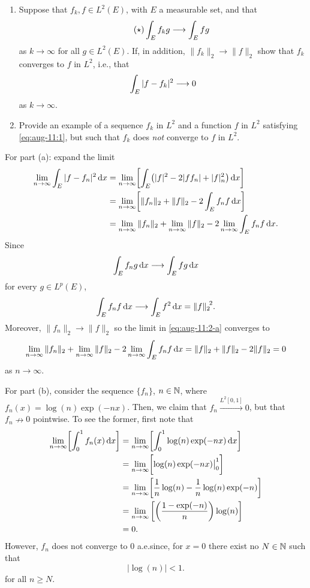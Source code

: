 \begin{problem}
  \hfill
  \begin{enumerate}[label=(\alph*),noitemsep]
  \item Suppose that \(f_k,f\in L^2(E)\), with \(E\) a measurable set, and
    that
    \[
      \label{eq:aug-11:1}
      \tag{\(\bigstar\)}
      \int_E f_kg\too\int_E fg
    \]
    as \(k\to\infty\) for all \(g\in L^2(E)\). If, in addition,
    \(\|f_k\|_2\to\|f\|_2\) show that \(f_k\) converges to \(f\) in
    \(L^2\), i.e., that
    \[
      \int_E|f-f_k|^2\longrightarrow 0
    \]
    as \(k\to\infty\).
  \item Provide an example of a sequence \(f_k\) in \(L^2\) and a function
    \(f\) in \(L^2\) satisfying \eqref{eq:aug-11:1}, but such that \(f_k\)
    does \emph{not} converge to \(f\) in \(L^2\).
  \end{enumerate}
\end{problem}
\begin{solution}
  For part (a): expand the limit
  \begin{gather}
    \label{eq:aug-11:2-a}
    \begin{aligned}
      \lim_{n\to\infty}\int_E|f-f_n|^2\mathop{}\!\mathrm{d} x
      &=\lim_{n\to\infty}\biggl[\int_E\bigl(|f|^2-2|ff_n|+|f|_n^2\bigr)\mathop{}\!\mathrm{d} x\biggr]\\
      &=\lim_{n\to\infty}\biggl[\|f_n\|_2+\|f\|_2-2\int_E f_nf\mathop{}\!\mathrm{d} x\biggr]\\
      &=\lim_{n\to\infty}\|f_n\|_2+\lim_{n\to\infty}\|f\|_2-2\lim_{n\to\infty}\int_E
      f_nf\mathop{}\!\mathrm{d} x.
    \end{aligned}
  \end{gather}
  Since
  \[
    \int_Ef_ng\mathop{}\!\mathrm{d} x\longrightarrow \int_E fg\mathop{}\!\mathrm{d} x
  \]
  for every \(g\in L^p(E)\),
  \[
    \int_E f_nf\mathop{}\!\mathrm{d} x\longrightarrow \int_Ef^2\mathop{}\!\mathrm{d} x={\|f\|_2}^{\!2}.
  \]
  Moreover, \(\|f_n\|_2\to\|f\|_2\) so the limit in \eqref{eq:aug-11:2-a}
  converges to
  \[
    \lim_{n\to\infty}\|f_n\|_2+\lim_{n\to\infty}\|f\|_2-2\lim_{n\to\infty}\int_E
    f_nf\diff x
    =%
    \|f\|_2+\|f\|_2-2\|f\|_2=0
  \]
  as \(n\to\infty\).

  For part (b), consider the sequence \(\{f_n\}\), \(n\in\mathbb{N}\), where
  \(f_n(x)=\log(n)\exp(-nx)\). Then, we claim that
  \(f_n\xrightarrow{L^2[0,1]}0\), but that \(f_n\nrightarrow 0\)
  pointwise. To see the former, first note that
  \[
    \begin{aligned}
      \lim_{n\to\infty}\biggl[\int_0^1 f_n(x)\diff x\biggr]
      &=\lim_{n\to\infty}\biggl[\int_0^1\log(n)\exp(-nx)\diff x\biggr]\\
      &=\lim_{n\to\infty}\biggl[\log(n)\exp(-nx)\bigr|_0^1\biggr]\\
      &=\lim_{n\to\infty}\biggl[
      \frac{1}{n}\log(n)-\frac{1}{n}\log(n)\exp(-n)
      \biggr]\\
      &=\lim_{n\to\infty}\left[%
        \biggl(\frac{1-\exp(-n)}{n}\biggr)\log(n)%
      \right]\\
      &=0.
    \end{aligned}
  \]
  However, \(f_n\) does not converge to \(0\) a.e.\@ since, for
  \(x=0\) there exist no \(N\in\mathbb{N}\) such that
  \[
    |\log(n)|<1.
  \]
  for all \(n\geq N\).
\end{solution}

